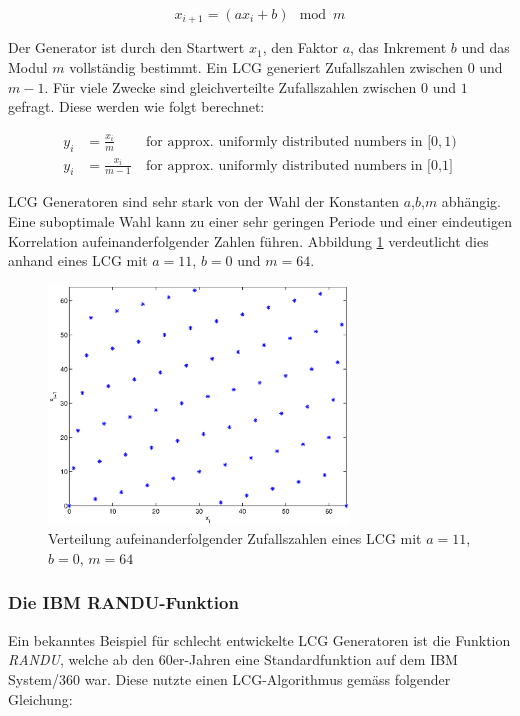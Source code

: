 \documentclass{book}
\begin{document}
\begin{refsection}
\begin{equation}
	x_{i+1} = \left( a x_{i} + b \right) \mod{m}
	\label{equ:lcg_equation}
\end{equation}

Der Generator ist durch den Startwert $x_1$, den Faktor $a$, das Inkrement $b$ und das Modul $m$ vollständig bestimmt. Ein LCG generiert Zufallszahlen zwischen $0$ und $m-1$. Für viele Zwecke sind gleichverteilte Zufallszahlen zwischen $0$ und $1$ gefragt. Diese werden wie folgt berechnet:

\begin{align}
	y_i &= \frac{x_i}{m} \: &\text{for approx. uniformly distributed numbers  in } [0,1)\\
	y_i &= \frac{x_i}{m-1} \: &\text{for approx. uniformly distributed numbers in [0,1]}
\end{align} 

LCG Generatoren sind sehr stark von der Wahl der Konstanten $a$,$b$,$m$ abhängig. Eine suboptimale Wahl kann zu einer sehr geringen Periode und einer eindeutigen Korrelation aufeinanderfolgender Zahlen führen. Abbildung \ref{fig:lcg_verteilung} verdeutlicht dies anhand eines LCG mit $a=11$, $b=0$ und $m=64$. \\

\begin{figure}[h]
	\centering
	\includegraphics[width=8cm]{images/lcg.eps}
	\caption{Verteilung aufeinanderfolgender Zufallszahlen eines LCG mit $a=11$, $b=0$, $m=64$}
	\label{fig:lcg_verteilung}
\end{figure}

\subsubsection{Die IBM RANDU-Funktion}
Ein bekanntes Beispiel für schlecht entwickelte LCG Generatoren ist die Funktion \textit{RANDU}, welche ab den 60er-Jahren eine Standardfunktion auf dem IBM System/360 war. Diese nutzte einen LCG-Algorithmus gemäss folgender Gleichung:


\end{refsection}
\end{document}
